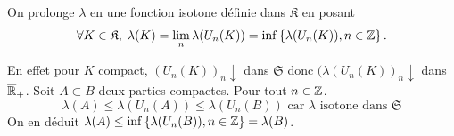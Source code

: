 \begin{prop}
On prolonge $\lambda$ en une fonction isotone définie dans $\mathfrak{K}$ en posant
\begin{displaymath}
 \forall K \in \mathfrak{K}, \; \lambda(K) = \lim_n \lambda(U_n(K)) = \inf\left\lbrace \lambda(U_n(K)), n\in \mathbb{Z} \right\rbrace.
\end{displaymath}
\end{prop}
\begin{demo}
En effet pour $K$ compact, $(U_n(K))_n \downarrow$ dans $\mathfrak{S}$ donc $(\lambda(U_n(K))_n \downarrow$ dans $\overline{\mathbb{R}}_+$.\newline
Soit $A \subset B$ deux parties compactes. Pour tout $n\in \mathbb{Z}$.
\begin{displaymath}
 \lambda(A) \leq \lambda(U_n(A)) \leq \lambda(U_n(B))\text{ car } \lambda \text{ isotone dans } \mathfrak{S}
\end{displaymath}
On en déduit $\lambda(A) \leq \inf\left\lbrace \lambda(U_n(B)), n\in \mathbb{Z} \right\rbrace = \lambda(B)$.
\end{demo}


